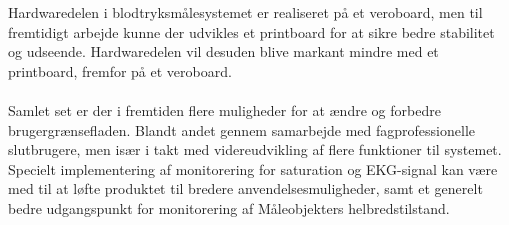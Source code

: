 Hardwaredelen i blodtryksmålesystemet er realiseret på et veroboard, men til fremtidigt arbejde kunne der udvikles et printboard for at sikre bedre stabilitet og udseende. Hardwaredelen vil desuden blive markant mindre med et printboard, fremfor på et veroboard. \\ \\

Samlet set er der i fremtiden flere muligheder for at ændre og forbedre brugergrænsefladen. Blandt andet gennem samarbejde med fagprofessionelle slutbrugere, men især i takt med videreudvikling af flere funktioner til systemet. \\
Specielt implementering af monitorering for saturation og EKG-signal kan være med til at løfte produktet til bredere anvendelsesmuligheder, samt et generelt bedre udgangspunkt for monitorering af Måleobjekters helbredstilstand.


